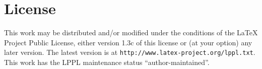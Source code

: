 \documentclass[11pt]{article}
\begin{document}
\section{License}\label{sec:license12}

This work may be distributed and/or modified under
the conditions of the \LaTeX{} Project Public License, either version 1.3c of this license or (at your
option) any later version. The latest version is at \texttt{http://www.latex-project.org/lppl.txt}. This
work has the LPPL maintenance status ``author-maintained''.
\end{document}
